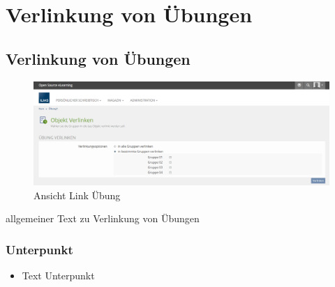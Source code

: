 \chapter{Verlinkung von Übungen}\label{linkUebung}
\minitoc
\clearpage

\section{Verlinkung von Übungen}
\begin{figure}
	\centering
	\includegraphics[width=1\textwidth]{img/linkUebung.png}
	\caption{Ansicht Link Übung}
\end{figure}

allgemeiner Text zu Verlinkung von Übungen 

\subsection*{Unterpunkt}
\begin{itemize}
	\item Text Unterpunkt
\end{itemize}

\clearpage
